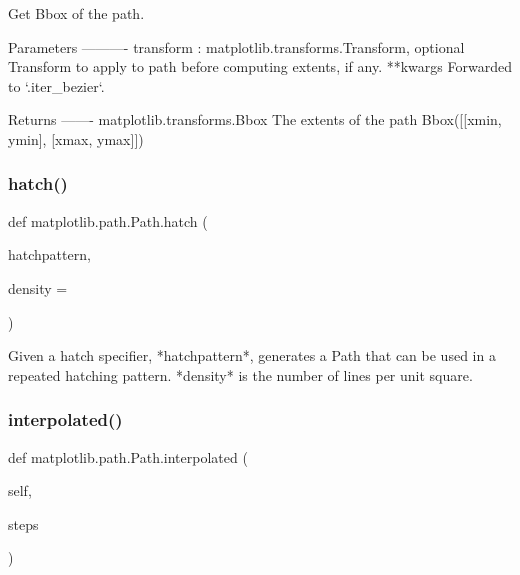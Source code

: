 \begin{DoxyVerb}Get Bbox of the path.

Parameters
----------
transform : matplotlib.transforms.Transform, optional
    Transform to apply to path before computing extents, if any.
**kwargs
    Forwarded to `.iter_bezier`.

Returns
-------
matplotlib.transforms.Bbox
    The extents of the path Bbox([[xmin, ymin], [xmax, ymax]])
\end{DoxyVerb}
 \mbox{\label{classmatplotlib_1_1path_1_1Path_a974fa9fa2569e5e79ef9bc3adf3a2e4a}} 
\subsubsection{\texorpdfstring{hatch()}{hatch()}}
{\footnotesize\ttfamily def matplotlib.\+path.\+Path.\+hatch (\begin{DoxyParamCaption}\item[{}]{hatchpattern,  }\item[{}]{density = {} }\end{DoxyParamCaption})\hspace{0.3cm}{\ttfamily [static]}}

\begin{DoxyVerb}Given a hatch specifier, *hatchpattern*, generates a Path that
can be used in a repeated hatching pattern.  *density* is the
number of lines per unit square.
\end{DoxyVerb}
 \mbox{\label{classmatplotlib_1_1path_1_1Path_aa92af2b6ec93ee82dcf60757ef308f00}} 
\subsubsection{\texorpdfstring{interpolated()}{interpolated()}}
{\footnotesize\ttfamily def matplotlib.\+path.\+Path.\+interpolated (\begin{DoxyParamCaption}\item[{}]{self,  }\item[{}]{steps }\end{DoxyParamCaption})}

